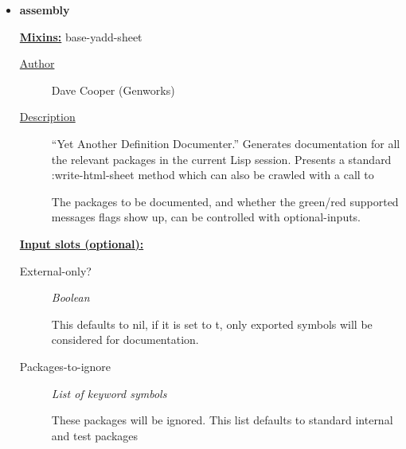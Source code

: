 \documentclass [11pt]{book}
\begin{document}
\begin{itemize}

\item {}
\label{prim:assembly}
\textbf{assembly}


\textbf{
\underline{Mixins:}} base-yadd-sheet





\begin{description}

\item [
\underline{Author}]


Dave Cooper (Genworks)



\item [
\underline{Description}]


``Yet Another Definition Documenter.'' Generates 
documentation for all the relevant packages in the current Lisp session. Presents a 
standard :write-html-sheet method which can also be crawled with a call to 


The packages to be documented, and whether the green/red supported 
messages flags show up, can be controlled with optional-inputs.



\end{description}








\textbf{
\underline{Input slots (optional):}}

\begin{description}

\item [External-only?]
\emph{Boolean}

 This defaults to nil, if it is set to t, only exported symbols will be
considered for documentation.




\item [Packages-to-ignore]
\emph{List of keyword symbols}

 These packages will be ignored.
This list defaults to standard internal and test packages




\end{description}







\end{itemize}
\end{document}
